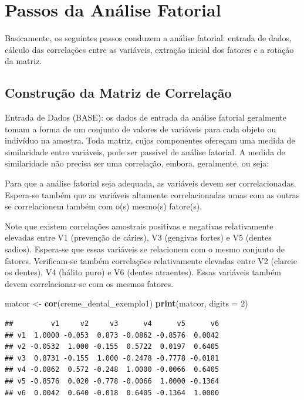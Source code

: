 \documentclass[12pt,brazil,]{book}
\newenvironment{Shaded}{\begin{snugshade}}{\end{snugshade}}
\newcommand{\DataTypeTok}[1]{\textcolor[rgb]{0.13,0.29,0.53}{#1}}
\newcommand{\DecValTok}[1]{\textcolor[rgb]{0.00,0.00,0.81}{#1}}
\newcommand{\KeywordTok}[1]{\textcolor[rgb]{0.13,0.29,0.53}{\textbf{#1}}}
\newcommand{\NormalTok}[1]{#1}
\newcommand{\StringTok}[1]{\textcolor[rgb]{0.31,0.60,0.02}{#1}}
\begin{document}
\hypertarget{passos-da-analise-fatorial}{%
\section{Passos da Análise Fatorial}\label{passos-da-analise-fatorial}}

Basicamente, os seguintes passos conduzem a análise fatorial: entrada de
dados, cálculo das correlações entre as variáveis, extração inicial dos
fatores e a rotação da matriz.

\hypertarget{construcao-da-matriz-de-correlacao}{%
\subsection{Construção da Matriz de
Correlação}\label{construcao-da-matriz-de-correlacao}}

Entrada de Dados (BASE): os dados de entrada da análise fatorial
geralmente tomam a forma de um conjunto de valores de variáveis para
cada objeto ou indivíduo na amostra. Toda matriz, cujos componentes
ofereçam uma medida de similaridade entre variáveis, pode ser passível
de análise fatorial. A medida de similaridade não precisa ser uma
correlação, embora, geralmente, ou seja:

Para que a análise fatorial seja adequada, as variáveis devem ser
correlacionadas. Espera-se também que as variáveis altamente
correlacionadas umas com as outras se correlacionem também com o(s)
mesmo(s) fatore(s).

Note que existem correlações amostrais positivas e negativas
relativamente elevadas entre V1 (prevenção de cáries), V3 (gengivas
fortes) e V5 (dentes sadios). Espera-se que essas variáveis se
relacionem com o mesmo conjunto de fatores. Verificam-se também
correlações relativamente elevadas entre V2 (clareie os dentes), V4
(hálito puro) e V6 (dentes atraentes). Essas variáveis também devem
correlacionar-se com os mesmos fatores.

\begin{Shaded}
\begin{Highlighting}[]
\NormalTok{matcor <-}\StringTok{ }\KeywordTok{cor}\NormalTok{(creme_dental_exemplo1)}
\KeywordTok{print}\NormalTok{(matcor, }\DataTypeTok{digits =} \DecValTok{2}\NormalTok{)}
\end{Highlighting}
\end{Shaded}

\begin{verbatim}
##         v1     v2     v3      v4      v5      v6
## v1  1.0000 -0.053  0.873 -0.0862 -0.8576  0.0042
## v2 -0.0532  1.000 -0.155  0.5722  0.0197  0.6405
## v3  0.8731 -0.155  1.000 -0.2478 -0.7778 -0.0181
## v4 -0.0862  0.572 -0.248  1.0000 -0.0066  0.6405
## v5 -0.8576  0.020 -0.778 -0.0066  1.0000 -0.1364
## v6  0.0042  0.640 -0.018  0.6405 -0.1364  1.0000
\end{verbatim}
\end{document}
